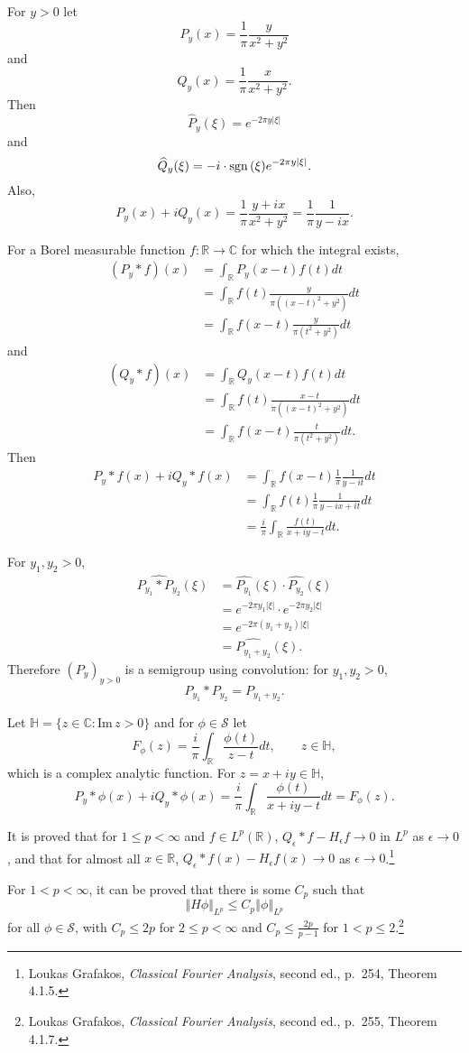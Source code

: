 \documentclass{article}
\def\Im{\ensuremath{\mathrm{Im}}\,}
\newcommand{\sgn}{\ensuremath\mathrm{sgn}\,}
\newcommand{\norm}[1]{\left\Vert #1 \right\Vert}
\theoremstyle{definition}
\begin{document}
For $y>0$ let
\[
P_y(x) = \frac{1}{\pi} \frac{y}{x^2+y^2} 
\]
and
\[
Q_y(x) = \frac{1}{\pi} \frac{x}{x^2+y^2}.
\]
Then
\[
\widehat{P}_y(\xi) = e^{-2\pi y|\xi|}
\]
and
\[
\widehat{Q}_y(\xi) = -i \cdot \sgn(\xi) e^{-2\pi y|\xi|}.
\]
Also,
\[
P_y(x)+iQ_y(x) = \frac{1}{\pi} \frac{y+ix}{x^2+y^2} = \frac{1}{\pi} \frac{1}{y-ix}.
\]


For a Borel measurable function $f:\mathbb{R} \to \mathbb{C}$ for which the integral exists,
\begin{align*}
(P_y*f)(x) &= \int_{\mathbb{R}} P_y(x-t) f(t) dt\\
&= \int_{\mathbb{R}}f(t) \frac{y}{\pi((x-t)^2+y^2)}  dt\\
&=\int_{\mathbb{R}} f(x-t) \frac{y}{\pi(t^2+y^2)} dt
\end{align*}
and 
\begin{align*}
(Q_y*f)(x) &= \int_{\mathbb{R}} Q_y(x-t) f(t) dt\\
&= \int_{\mathbb{R}}f(t)  \frac{x-t}{\pi((x-t)^2+y^2)}  dt\\
&=\int_{\mathbb{R}} f(x-t) \frac{t}{\pi(t^2+y^2)} dt.
\end{align*}
Then
\begin{align*}
P_y*f(x)+iQ_y*f(x)&=\int_{\mathbb{R}} f(x-t)  \frac{1}{\pi} \frac{1}{y-it} dt\\
&=\int_{\mathbb{R}} f(t) \frac{1}{\pi} \frac{1}{y-ix+it} dt\\
&=\frac{i}{\pi} \int_{\mathbb{R}} \frac{f(t)}{x+iy-t} dt.
\end{align*}



For $y_1,y_2>0$,
\begin{align*}
\widehat{P_{y_1}*P_{y_2}}(\xi)&=\widehat{P_{y_1}}(\xi) \cdot \widehat{P_{y_2}}(\xi)\\
&= e^{-2\pi y_1 |\xi|} \cdot  e^{-2\pi y_2|\xi|}\\
&=e^{-2\pi(y_1+y_2) |\xi|}\\
&=\widehat{P_{y_1+y_2}}(\xi).
\end{align*}
Therefore $(P_y)_{y>0}$ is a semigroup using convolution: for $y_1,y_2>0$,
\[
P_{y_1} * P_{y_2} = P_{y_1+y_2}.
\]


Let $\mathbb{H} = \{z \in \mathbb{C} : \Im z>0\}$ and for $\phi \in \mathscr{S}$ let
\[
F_\phi(z) = \frac{i}{\pi} \int_{\mathbb{R}} \frac{\phi(t)}{z-t} dt,\qquad z \in \mathbb{H},
\]
which is a complex analytic function. For
$z=x+iy \in \mathbb{H}$,
\[
P_y *\phi (x) + iQ_y * \phi(x) = \frac{i}{\pi} \int_{\mathbb{R}} \frac{\phi(t)}{x+iy-t} dt
=F_\phi(z).
\]

It is proved that for $1 \leq p < \infty$ and $f \in L^p(\mathbb{R})$,
$Q_\epsilon*f - H_\epsilon f \to 0$ in $L^p$ as $\epsilon \to 0$, and that for almost all $x \in \mathbb{R}$,
$Q_\epsilon*f(x) - H_\epsilon f(x) \to 0$ as $\epsilon \to 0$.\footnote{Loukas Grafakos,
{\em Classical Fourier Analysis}, second ed.,
p.~254, Theorem 4.1.5.}

For $1<p<\infty$, it can be proved that there is some $C_p$ such that 
\[
\norm{H\phi}_{L^p} \leq C_p \norm{\phi}_{L^p}
\]
for all $\phi \in \mathscr{S}$, with $C_p \leq 2p$ for $2 \leq p < \infty$
and $C_p \leq \frac{2p}{p-1}$ for $1<p \leq 2$.\footnote{Loukas Grafakos,
{\em Classical Fourier Analysis}, second ed.,
p.~255, Theorem 4.1.7.}
\end{document}
